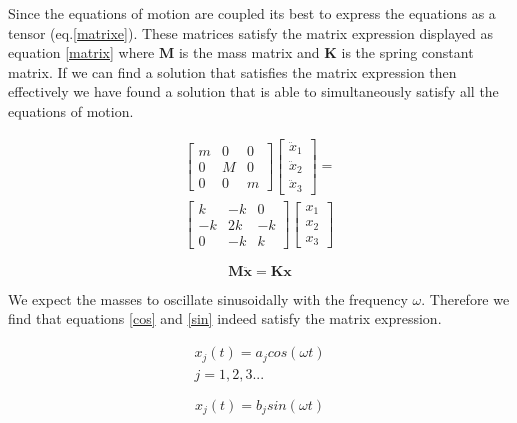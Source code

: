 \documentclass[hidelinks]{article}
\begin{document}
\begin{multicols}{2}
Since the equations of motion are coupled its best to express the equations as a tensor (eq.\ref{matrixe}). These matrices satisfy the matrix expression displayed as equation \ref{matrix} where $\mathbf{M}$ is the mass matrix and $\mathbf{K}$ is the spring constant matrix. If we can find a solution that satisfies the matrix expression then effectively we have found a solution that is able to simultaneously satisfy all the equations of motion.

\begin{equation}
\label{matrixe}
\begin{split}
\begin{bmatrix}
m & 0 & 0 \\
0 & M & 0 \\
0 & 0 & m 
\end{bmatrix}
\begin{bmatrix}
\ddot{x}_1 \\
\ddot{x}_2 \\
\ddot{x}_3
\end{bmatrix}
=\\
\begin{bmatrix}
k & -k & 0 \\
-k & 2k & -k \\
0 & -k & k 
\end{bmatrix}
\begin{bmatrix}
x_1 \\
x_2 \\
x_3
\end{bmatrix}
\end{split}
\end{equation}

\begin{equation}
\label{matrix}
\mathbf{M\ddot{x}}=\mathbf{Kx}
\end{equation}



We expect the masses to oscillate sinusoidally with the frequency $\omega$. Therefore we find that equations \ref{cos} and \ref{sin} indeed satisfy the matrix expression.

\begin{equation}
\label{cos}
\begin{split}
x_j(t) = a_jcos(\omega t)\\
j=1,2,3...
\end{split}
\end{equation}

\begin{equation}
\label{sin}
x_j(t) = b_jsin(\omega t)
\end{equation}


\end{multicols}
\end{document}
